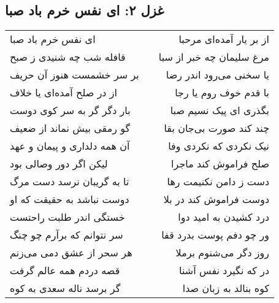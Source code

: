 \begin{center}
\section*{غزل ۲: ای نفس خرم باد صبا}
\label{sec:002}
\begin{longtable}{l p{0.5cm} r}
ای نفس خرم باد صبا
&&
از بر یار آمده‌ای مرحبا
\\
قافله شب چه شنیدی ز صبح
&&
مرغ سلیمان چه خبر از سبا
\\
بر سر خشمست هنوز آن حریف
&&
یا سخنی می‌رود اندر رضا
\\
از در صلح آمده‌ای یا خلاف
&&
با قدم خوف روم یا رجا
\\
بار دگر گر به سر کوی دوست
&&
بگذری ای پیک نسیم صبا
\\
گو رمقی بیش نماند از ضعیف
&&
چند کند صورت بی‌جان بقا
\\
آن همه دلداری و پیمان و عهد
&&
نیک نکردی که نکردی وفا
\\
لیکن اگر دور وصالی بود
&&
صلح فراموش کند ماجرا
\\
تا به گریبان نرسد دست مرگ
&&
دست ز دامن نکنیمت رها
\\
دوست نباشد به حقیقت که او
&&
دوست فراموش کند در بلا
\\
خستگی اندر طلبت راحتست
&&
درد کشیدن به امید دوا
\\
سر نتوانم که برآرم چو چنگ
&&
ور چو دفم پوست بدرد قفا
\\
هر سحر از عشق دمی می‌زنم
&&
روز دگر می‌شنوم برملا
\\
قصه دردم همه عالم گرفت
&&
در که نگیرد نفس آشنا
\\
گر برسد ناله سعدی به کوه
&&
کوه بنالد به زبان صدا
\\
\end{longtable}
\end{center}
